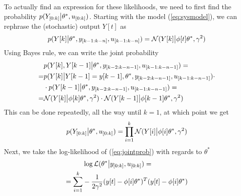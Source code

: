 To actually find an expression for these likelihoods, we need to first find the probability
$p(Y_{[0:k]}\big{|}\theta^*, u_{[0:k]})$. Starting with the model (\ref{eq:sysmodel}), we
can rephrase the (stochastic) output $Y[t]$ as
\begin{equation}
    p(Y[k]\big{\vert} \theta^*,  y_{[k-1:k-n]}, u_{[k-1:k-n]}) =
    \mathcal{N}(Y[k]\big{\vert}\phi[t]\theta^*, \gamma^2)
\end{equation}
Using Bayes rule, we can write the joint probability
\begin{equation}
    \small
    \begin{aligned}
        &p(Y[k],Y[k-1]\big{\vert}\theta^*,y_{[k-2:k-n-1]}, u_{[k-1:k-n-1]}) = \\
        =& p(Y[k]\big{\vert}Y[k-1]=y[k-1], \theta^*, y_{[k-2:k-n-1]}, u_{[k-1:k-n-1]})\cdot \\
        &\cdot p(Y[k-1]\big{\vert}\theta^*, y_{[k-2:k-n-1]}, u_{[k-1:k-n-1]}) = \\
        =& \mathcal{N}(Y[k]\big{\vert}\phi[k]\theta^*, \gamma^2)\cdot
        \mathcal{N}(Y[k-1]\big{\vert}\phi[k-1]\theta^*, \gamma^2)
\end{aligned}
\notag
\end{equation}
This can be done repeatedly, all the way until $k=1$, at which point we get
\begin{equation}
    p(Y_{[0:k]}\big{\vert}\theta^*, u_{[0:k]}) 
    = \prod\limits_{i=1}^k \mathcal{N}(Y[i]\big{|}\phi[i]\theta^*, \gamma^2)
    \label{eq:jointprob}
\end{equation}
Next, we take the log-likelihood of (\ref{eq:jointprob}) with regards to $\theta^*$
\begin{equation}
    \begin{aligned}
        &\log \mathcal{L}(\theta^*\big{|} y_{[0:k]}, u_{[0:k]}) = \\ =\sum\limits_{i=1}^{k}
        &-\frac{1}{2\gamma^2}(y[t]-\phi[i]\theta^*)^T(y[t]-\phi[i]\theta^*)
    \end{aligned}
    \label{eq:loglikelihood}
\end{equation}

